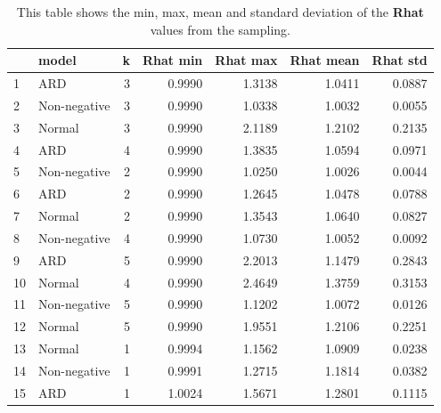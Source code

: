 \documentclass[12pt]{article}
\begin{document}
    \begin{table}[H]
        \centering
        \caption{This table shows the min, max, mean and standard deviation of the \textbf{Rhat} values from the sampling.}
        \begin{tabular}{llr|rr|rr}
            \toprule
            {} &         model &  k &  Rhat min &  Rhat max &  Rhat mean &  Rhat std \\
            \midrule
            1  &           ARD &  3 &    0.9990 &    1.3138 &     1.0411 &    0.0887 \\
            2  &  Non-negative &  3 &    0.9990 &    1.0338 &     1.0032 &    0.0055 \\
            3  &        Normal &  3 &    0.9990 &    2.1189 &     1.2102 &    0.2135 \\
            4  &           ARD &  4 &    0.9990 &    1.3835 &     1.0594 &    0.0971 \\
            5  &  Non-negative &  2 &    0.9990 &    1.0250 &     1.0026 &    0.0044 \\
            6  &           ARD &  2 &    0.9990 &    1.2645 &     1.0478 &    0.0788 \\
            7  &        Normal &  2 &    0.9990 &    1.3543 &     1.0640 &    0.0827 \\
            8  &  Non-negative &  4 &    0.9990 &    1.0730 &     1.0052 &    0.0092 \\
            9  &           ARD &  5 &    0.9990 &    2.2013 &     1.1479 &    0.2843 \\
            10 &        Normal &  4 &    0.9990 &    2.4649 &     1.3759 &    0.3153 \\
            11 &  Non-negative &  5 &    0.9990 &    1.1202 &     1.0072 &    0.0126 \\
            12 &        Normal &  5 &    0.9990 &    1.9551 &     1.2106 &    0.2251 \\
            13 &        Normal &  1 &    0.9994 &    1.1562 &     1.0909 &    0.0238 \\
            14 &  Non-negative &  1 &    0.9991 &    1.2715 &     1.1814 &    0.0382 \\
            15 &           ARD &  1 &    1.0024 &    1.5671 &     1.2801 &    0.1115 \\
            \bottomrule
            \end{tabular}
    \end{table}
    
\end{document}
